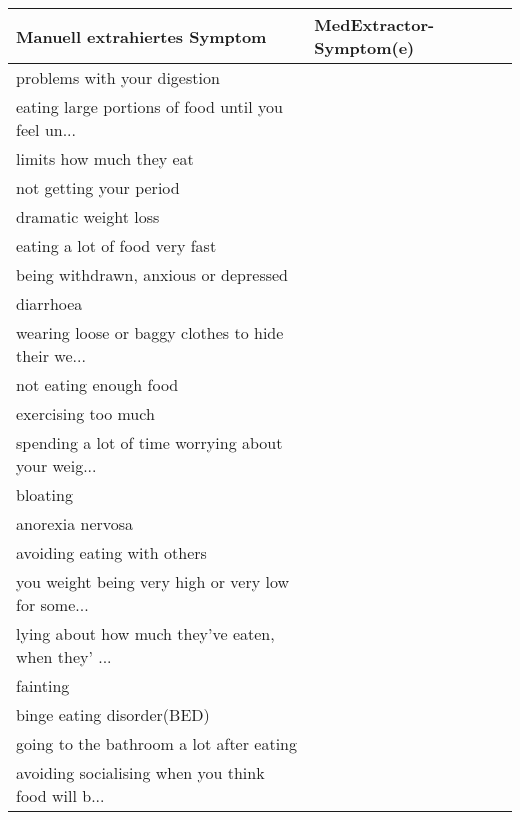 \begin{table}[H]
\begin{center}
\begin{tabular}{ll}
\toprule
                      Manuell extrahiertes Symptom &       MedExtractor-Symptom(e) \\
\midrule
                     problems with your digestion &               \\
eating large portions of food until you feel un... &               \\
                          limits how much they eat &               \\
                           not getting your period &               \\
                              dramatic weight loss &               \\
                    eating a lot of food very fast &               \\
             being withdrawn, anxious or depressed &               \\
                                         diarrhoea &               \\
wearing loose or baggy clothes to hide their we... &               \\
                            not eating enough food &               \\
                               exercising too much &               \\
spending a lot of time worrying about your weig... &               \\
                                          bloating &               \\
                                  anorexia nervosa &               \\
                       avoiding eating with others &               \\
you weight being very high or very low for some... &               \\
lying about how much they've eaten, when they' ... &               \\
                                          fainting &               \\
                        binge eating disorder(BED) &               \\
          going to the bathroom a lot after eating &               \\
avoiding socialising when you think food will b... &               \\

\end{tabular}
\end{center}
\end{table}
